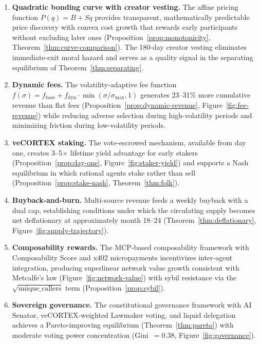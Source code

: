 \begin{enumerate}
  \item \textbf{Quadratic bonding curve with creator vesting.} The affine
    pricing function $P(q) = B + Sq$ provides transparent, mathematically
    predictable price discovery with convex cost growth that rewards early
    participants without excluding later ones
    (Proposition~\ref{prop:monotonicity}, Theorem~\ref{thm:curve-comparison}).
    The 180-day creator vesting eliminates immediate-exit moral hazard and
    serves as a quality signal in the separating equilibrium of
    Theorem~\ref{thm:separating}.

  \item \textbf{Dynamic fees.} The volatility-adaptive fee function
    $f(\sigma) = f_{\text{base}} + f_{\text{dyn}} \cdot \min(\sigma/\sigma_{\max}, 1)$
    generates 23--31\% more cumulative revenue than flat fees
    (Proposition~\ref{prop:dynamic-revenue}, Figure~\ref{fig:fee-revenue})
    while reducing adverse selection during high-volatility periods and
    minimizing friction during low-volatility periods.

  \item \textbf{veCORTEX staking.} The vote-escrowed mechanism, available from
    day one, creates 3--5$\times$ lifetime yield advantage for early stakers
    (Proposition~\ref{prop:day-one}, Figure~\ref{fig:staker-yield}) and
    supports a Nash equilibrium in which rational agents stake rather than sell
    (Proposition~\ref{prop:stake-nash}, Theorem~\ref{thm:folk}).

  \item \textbf{Buyback-and-burn.} Multi-source revenue feeds a weekly buyback
    with a dual cap, establishing conditions under which the circulating supply
    becomes net deflationary at approximately month 18--24
    (Theorem~\ref{thm:deflationary}, Figure~\ref{fig:supply-trajectory}).

  \item \textbf{Composability rewards.} The MCP-based composability framework
    with Composability Score and x402 micropayments incentivizes inter-agent
    integration, producing superlinear network value growth consistent with
    Metcalfe's law (Figure~\ref{fig:network-value}) with sybil resistance
    via the $\sqrt{\text{unique\_callers}}$ term
    (Proposition~\ref{prop:sybil}).

  \item \textbf{Sovereign governance.} The constitutional governance framework
    with AI Senator, veCORTEX-weighted Lawmaker voting, and liquid delegation
    achieves a Pareto-improving equilibrium
    (Theorem~\ref{thm:pareto}) with moderate voting power concentration
    (Gini~$= 0.38$, Figure~\ref{fig:governance}).
\end{enumerate}

